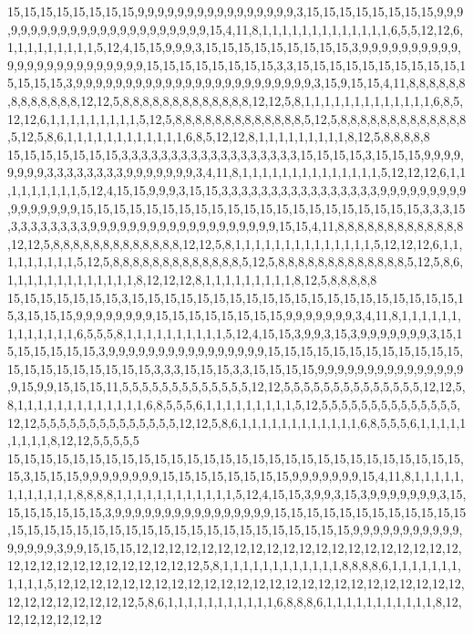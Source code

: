 15,15,15,15,15,15,15,15,9,9,9,9,9,9,9,9,9,9,9,9,9,9,9,9,3,15,15,15,15,15,15,15,15,9,9,9,9,9,9,9,9,9,9,9,9,9,9,9,9,9,9,9,9,9,9,9,15,4,11,8,1,1,1,1,1,1,1,1,1,1,1,1,1,6,5,5,12,12,6,1,1,1,1,1,1,1,1,1,5,12,4,15,15,9,9,9,3,15,15,15,15,15,15,15,15,15,3,9,9,9,9,9,9,9,9,9,9,9,9,9,9,9,9,9,9,9,9,9,9,9,9,15,15,15,15,15,15,15,15,3,3,15,15,15,15,15,15,15,15,15,15,15,15,15,15,3,9,9,9,9,9,9,9,9,9,9,9,9,9,9,9,9,9,9,9,9,9,9,9,9,3,15,9,15,15,4,11,8,8,8,8,8,8,8,8,8,8,8,8,8,12,12,5,8,8,8,8,8,8,8,8,8,8,8,8,8,12,12,5,8,1,1,1,1,1,1,1,1,1,1,1,1,1,6,8,5,12,12,6,1,1,1,1,1,1,1,1,1,5,12,5,8,8,8,8,8,8,8,8,8,8,8,8,8,5,12,5,8,8,8,8,8,8,8,8,8,8,8,8,8,5,12,5,8,6,1,1,1,1,1,1,1,1,1,1,1,1,6,8,5,12,12,8,1,1,1,1,1,1,1,1,1,8,12,5,8,8,8,8,8
15,15,15,15,15,15,15,3,3,3,3,3,3,3,3,3,3,3,3,3,3,3,3,3,3,15,15,15,15,3,15,15,15,9,9,9,9,9,9,9,9,3,3,3,3,3,3,3,3,9,9,9,9,9,9,9,3,4,11,8,1,1,1,1,1,1,1,1,1,1,1,1,1,1,5,12,12,12,6,1,1,1,1,1,1,1,1,1,5,12,4,15,15,9,9,9,3,15,15,3,3,3,3,3,3,3,3,3,3,3,3,3,3,3,3,9,9,9,9,9,9,9,9,9,9,9,9,9,9,9,9,15,15,15,15,15,15,15,15,15,15,15,15,15,15,15,15,15,15,15,15,15,3,3,3,15,3,3,3,3,3,3,3,3,9,9,9,9,9,9,9,9,9,9,9,9,9,9,9,9,9,9,9,15,15,4,11,8,8,8,8,8,8,8,8,8,8,8,8,8,12,12,5,8,8,8,8,8,8,8,8,8,8,8,8,8,12,12,5,8,1,1,1,1,1,1,1,1,1,1,1,1,1,1,5,12,12,12,6,1,1,1,1,1,1,1,1,1,5,12,5,8,8,8,8,8,8,8,8,8,8,8,8,8,5,12,5,8,8,8,8,8,8,8,8,8,8,8,8,8,5,12,5,8,6,1,1,1,1,1,1,1,1,1,1,1,1,1,8,12,12,12,8,1,1,1,1,1,1,1,1,1,8,12,5,8,8,8,8,8
15,15,15,15,15,15,15,3,15,15,15,15,15,15,15,15,15,15,15,15,15,15,15,15,15,15,15,15,15,3,15,15,15,9,9,9,9,9,9,9,9,15,15,15,15,15,15,15,15,9,9,9,9,9,9,9,3,4,11,8,1,1,1,1,1,1,1,1,1,1,1,1,1,6,5,5,5,8,1,1,1,1,1,1,1,1,1,1,5,12,4,15,15,3,9,9,3,15,3,9,9,9,9,9,9,9,3,15,15,15,15,15,15,15,3,9,9,9,9,9,9,9,9,9,9,9,9,9,9,9,9,15,15,15,15,15,15,15,15,15,15,15,15,15,15,15,15,15,15,15,15,15,3,3,3,15,15,15,3,3,15,15,15,15,9,9,9,9,9,9,9,9,9,9,9,9,9,9,9,9,15,9,9,15,15,15,11,5,5,5,5,5,5,5,5,5,5,5,5,5,12,12,5,5,5,5,5,5,5,5,5,5,5,5,5,5,12,12,5,8,1,1,1,1,1,1,1,1,1,1,1,1,1,6,8,5,5,5,6,1,1,1,1,1,1,1,1,1,5,12,5,5,5,5,5,5,5,5,5,5,5,5,5,5,12,12,5,5,5,5,5,5,5,5,5,5,5,5,5,5,12,12,5,8,6,1,1,1,1,1,1,1,1,1,1,1,1,6,8,5,5,5,6,1,1,1,1,1,1,1,1,1,8,12,12,5,5,5,5,5
15,15,15,15,15,15,15,15,15,15,15,15,15,15,15,15,15,15,15,15,15,15,15,15,15,15,15,15,15,3,15,15,15,9,9,9,9,9,9,9,9,15,15,15,15,15,15,15,15,9,9,9,9,9,9,9,15,4,11,8,1,1,1,1,1,1,1,1,1,1,1,1,8,8,8,8,1,1,1,1,1,1,1,1,1,1,1,1,5,12,4,15,15,3,9,9,3,15,3,9,9,9,9,9,9,9,3,15,15,15,15,15,15,15,3,9,9,9,9,9,9,9,9,9,9,9,9,9,9,9,9,15,15,15,15,15,15,15,15,15,15,15,15,15,15,15,15,15,15,15,15,15,15,15,15,15,15,15,15,15,15,15,15,15,9,9,9,9,9,9,9,9,9,9,9,9,9,9,9,9,3,9,9,15,15,15,12,12,12,12,12,12,12,12,12,12,12,12,12,12,12,12,12,12,12,12,12,12,12,12,12,12,12,12,12,12,12,12,5,8,1,1,1,1,1,1,1,1,1,1,1,1,8,8,8,8,6,1,1,1,1,1,1,1,1,1,1,1,5,12,12,12,12,12,12,12,12,12,12,12,12,12,12,12,12,12,12,12,12,12,12,12,12,12,12,12,12,12,12,12,12,12,5,8,6,1,1,1,1,1,1,1,1,1,1,1,6,8,8,8,6,1,1,1,1,1,1,1,1,1,1,1,8,12,12,12,12,12,12,12
